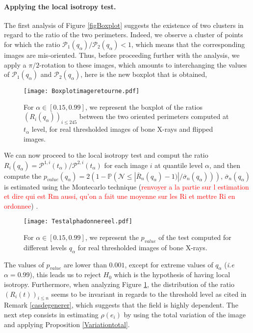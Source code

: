 \documentclass[12pt]{article}
\theoremstyle{Theorem}
\theoremstyle{definition}
\begin{document}
\paragraph{Applying the local isotropy test.}The first analysis of Figure \ref{figBoxplot} suggests the existence of two clusters in regard to the ratio of the two perimeters. Indeed, we observe a cluster of points for which the ratio $\mathcal{P}_{1}(q_{\alpha})/\mathcal{P}_{2}(q_{\alpha}) < 1$, which means that the corresponding images are mis-oriented. Thus, before proceeding further with the analysis, we apply a $\pi/2$-rotation to these images, which amounts to interchanging the values of $\mathcal{P}_{1}(q_{\alpha})$ and $ \mathcal{P}_{2}(q_{\alpha})$, here is the new boxplot that is obtained,
\vspace{-0.5cm}
\begin{figure}[H]
  \centering
    {\texttt{[image: Boxplotimageretourne.pdf]}}
    \hspace{0.2cm}
 \caption{For $\alpha \in [0.15, 0.99]$, we represent the boxplot of the ratios $(R_{i}(q_{\alpha}))_{i \leq 245}$ between the two oriented perimeters computed at $t_{\alpha}$ level, for real thresholded images of bone X-rays and flipped images.}
\label{Boxplotretournee}
\end{figure}
\vspace{-0.5cm}
We can now proceed to the local isotropy test and comput the ratio $R_{i}(q_{\alpha}) = \mathcal{P}^{1,i}(t_{\alpha})/\mathcal{P}^{2,i}(t_{\alpha})$ for each image $i$ at quantile level $\alpha$, and then compute  \linebreak the $p_{value}(q_{\alpha}) = 2(1-\mathbb{P}\left(\mathcal{N} \leq \left|\overline{R}_{n}(q_{\alpha}) - 1)\right|/\overline{\sigma}_{n}(q_{\alpha})\right))$, $\overline{\sigma}_{n}(q_{\alpha})$ is estimated using the Montecarlo technique (\textcolor{red}{renvoyer a la partie sur l estimation et dire qui est Rm aussi, qu'on a fait une moyenne sur les Ri et mettre Ri en ordonnee}) . 
\begin{figure}[H]
  \centering
    {\texttt{[image: Testalphadonnereel.pdf]}}
    \hspace{0.2cm}
 \caption{For $\alpha \in [0.15, 0.99]$, we represent the $p_{value}$ of the test computed for different levels $q_{\alpha}$ for real thresholded images of bone X-rays.}
\end{figure}
The values of $p_{value}$ are lower than $0.001$, except for extreme values of $q_{\alpha}$ (\textit{i.e} $\alpha = 0.99$), this leads us to reject $H_{0}$ which is the hypothesis of having local isotropy. Furthermore, when analyzing Figure \ref{Boxplotretournee}, the distribution of the ratio $\left(R_{i}(t)\right)_{i\leq n}$ seems to be invariant in regards to the threshold level as cited in Remark \ref{casdegenerer}, which suggests that the field is highly dependent. The next step consists in estimating $\rho(e_i)$ by using the total variation of the image and applying Proposition \ref{Variationtotal}. 
\end{document}
